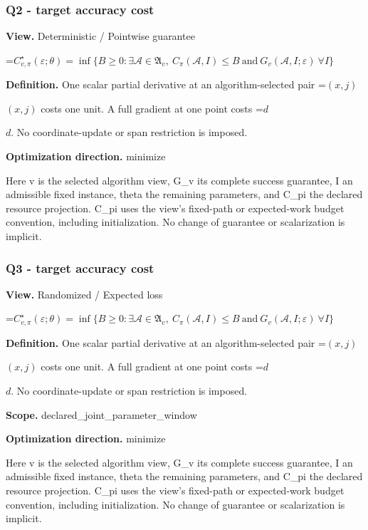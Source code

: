 \documentclass[10pt,a4paper]{article}
\newcommand{\AtlasMath}[1]{\par\begingroup\centering\setbox0=\hbox{$\displaystyle #1$}\ifdim\wd0>1.4\linewidth\typeout{ATLAS WIDE FORMULA: \the\wd0}\fi\ifdim\wd0>\linewidth\resizebox{\linewidth}{!}{\box0}\else\box0\fi\par\endgroup}
\newcommand{\AtlasInlineMath}[1]{\begingroup\setbox0=\hbox{$#1$}\ifdim\wd0>.4\linewidth\endgroup\AtlasMath{#1}\else\endgroup$#1$\fi}
\begin{document}
\subsubsection{Q2 - target accuracy cost}
\textbf{View.} Deterministic / Pointwise guarantee

\AtlasMath{C^\star_{v,\pi}(\varepsilon;\theta)=\inf\{B\ge0:\exists\mathcal A\in\mathfrak A_v,\ C_\pi(\mathcal A,I)\le B\ \text{and}\ G_v(\mathcal A,I;\varepsilon)\ \forall I\}}
\textbf{Definition.} One scalar partial derivative at an algorithm-selected pair \AtlasInlineMath{(x,j)} costs one unit. A full gradient at one point costs \AtlasInlineMath{d}. No coordinate-update or span restriction is imposed.

\textbf{Optimization direction.} minimize

Here v is the selected algorithm view, G\_\allowbreak{}v its complete success guarantee, I an admissible fixed instance, theta the remaining parameters, and C\_\allowbreak{}pi the declared resource projection. C\_\allowbreak{}pi uses the view's fixed-path or expected-work budget convention, including initialization. No change of guarantee or scalarization is implicit.

\subsubsection{Q3 - target accuracy cost}
\textbf{View.} Randomized / Expected loss

\AtlasMath{C^\star_{v,\pi}(\varepsilon;\theta)=\inf\{B\ge0:\exists\mathcal A\in\mathfrak A_v,\ C_\pi(\mathcal A,I)\le B\ \text{and}\ G_v(\mathcal A,I;\varepsilon)\ \forall I\}}
\textbf{Definition.} One scalar partial derivative at an algorithm-selected pair \AtlasInlineMath{(x,j)} costs one unit. A full gradient at one point costs \AtlasInlineMath{d}. No coordinate-update or span restriction is imposed.

\textbf{Scope.} declared\_\allowbreak{}joint\_\allowbreak{}parameter\_\allowbreak{}window

\textbf{Optimization direction.} minimize

Here v is the selected algorithm view, G\_\allowbreak{}v its complete success guarantee, I an admissible fixed instance, theta the remaining parameters, and C\_\allowbreak{}pi the declared resource projection. C\_\allowbreak{}pi uses the view's fixed-path or expected-work budget convention, including initialization. No change of guarantee or scalarization is implicit.
\end{document}

